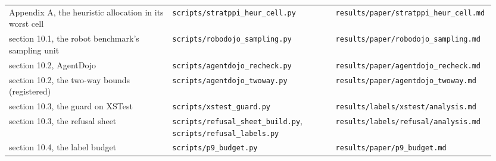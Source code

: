 \documentclass[11pt]{article}
\begin{document}
\begin{longtable}{@{}>{\raggedright\arraybackslash}p{0.334\linewidth}>{\raggedright\arraybackslash}p{0.333\linewidth}>{\raggedright\arraybackslash}p{0.279\linewidth}@{}}
\hspace{0pt}Appendix A, the heuristic allocation in its worst cell & \hspace{0pt}\texttt{scripts/\allowbreak stratppi\_\allowbreak heur\_\allowbreak cell.py} & \hspace{0pt}\texttt{results/\allowbreak paper/\allowbreak stratppi\_\allowbreak heur\_\allowbreak cell.md} \\
\hspace{0pt}section 10.1, the robot benchmark's sampling unit & \hspace{0pt}\texttt{scripts/\allowbreak robodojo\_\allowbreak sampling.py} & \hspace{0pt}\texttt{results/\allowbreak paper/\allowbreak robodojo\_\allowbreak sampling.md} \\
\hspace{0pt}section 10.2, AgentDojo & \hspace{0pt}\texttt{scripts/\allowbreak agentdojo\_\allowbreak recheck.py} & \hspace{0pt}\texttt{results/\allowbreak paper/\allowbreak agentdojo\_\allowbreak recheck.md} \\
\hspace{0pt}section 10.2, the two-way bounds (registered) & \hspace{0pt}\texttt{scripts/\allowbreak agentdojo\_\allowbreak twoway.py} & \hspace{0pt}\texttt{results/\allowbreak paper/\allowbreak agentdojo\_\allowbreak twoway.md} \\
\hspace{0pt}section 10.3, the guard on XSTest & \hspace{0pt}\texttt{scripts/\allowbreak xstest\_\allowbreak guard.py} & \hspace{0pt}\texttt{results/\allowbreak labels/\allowbreak xstest/\allowbreak analysis.md} \\
\hspace{0pt}section 10.3, the refusal sheet & \hspace{0pt}\texttt{scripts/\allowbreak refusal\_\allowbreak sheet\_\allowbreak build.py}, \texttt{scripts/\allowbreak refusal\_\allowbreak labels.py} & \hspace{0pt}\texttt{results/\allowbreak labels/\allowbreak refusal/\allowbreak analysis.md} \\
\hspace{0pt}section 10.4, the label budget & \hspace{0pt}\texttt{scripts/\allowbreak p9\_\allowbreak budget.py} & \hspace{0pt}\texttt{results/\allowbreak paper/\allowbreak p9\_\allowbreak budget.md} \\

\end{longtable}
\end{document}
